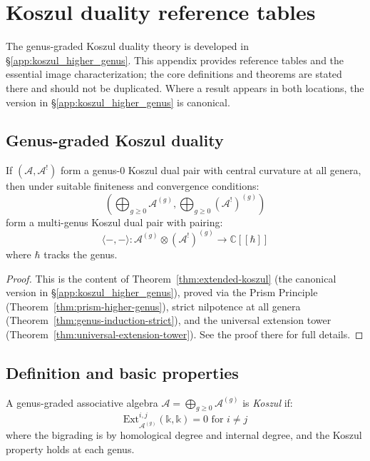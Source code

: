 \chapter{Koszul duality reference tables}
\label{app:koszul-reference}


\begin{remark}
The genus-graded Koszul duality theory is developed in
\S\ref{app:koszul_higher_genus}.  This appendix provides reference
tables and the essential image characterization; the core definitions
and theorems are stated there and should not be duplicated.  Where a
result appears in both locations, the version in
\S\ref{app:koszul_higher_genus} is canonical.
\end{remark}

\section{Genus-graded Koszul duality}

\begin{theorem}
\label{thm:extended-koszul-appendix}
If $(\mathcal{A}, \mathcal{A}^!)$ form a genus-0 Koszul dual pair with central curvature at
all genera, then under suitable finiteness and convergence conditions:
\[\left(\bigoplus_{g \geq 0} \mathcal{A}^{(g)}, \bigoplus_{g \geq 0} (\mathcal{A}^!)^{(g)}\right)\]
form a multi-genus Koszul dual pair with pairing:
\[\langle -, - \rangle: \mathcal{A}^{(g)} \otimes (\mathcal{A}^!)^{(g)} \to \mathbb{C}[\![\hbar]\!]\]
where $\hbar$ tracks the genus.
\end{theorem}

\begin{proof}
This is the content of Theorem~\ref{thm:extended-koszul} (the canonical version in
\S\ref{app:koszul_higher_genus}), proved via the Prism Principle
(Theorem~\ref{thm:prism-higher-genus}), strict nilpotence at all genera
(Theorem~\ref{thm:genus-induction-strict}), and the universal extension tower
(Theorem~\ref{thm:universal-extension-tower}).  See the proof there for full details.
\end{proof}

\section{Definition and basic properties}

\begin{definition}
A genus-graded associative algebra $\mathcal{A} = \bigoplus_{g \geq 0} \mathcal{A}^{(g)}$ is \emph{Koszul} if:
\[\text{Ext}_{\mathcal{A}^{(g)}}^{i,j}(\mathbb{k}, \mathbb{k}) = 0 \text{ for } i \neq j\]
where the bigrading is by homological degree and internal degree, and the Koszul property holds at each genus.
\end{definition}

